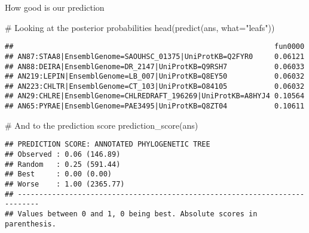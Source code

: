 \documentclass[9pt,ignorenonframetext,]{beamer}
\newenvironment{Shaded}{\begin{snugshade}}{\end{snugshade}}
\newcommand{\KeywordTok}[1]{\textcolor[rgb]{0.94,0.87,0.69}{#1}}
\newcommand{\DataTypeTok}[1]{\textcolor[rgb]{0.87,0.87,0.75}{#1}}
\newcommand{\StringTok}[1]{\textcolor[rgb]{0.80,0.58,0.58}{#1}}
\newcommand{\CommentTok}[1]{\textcolor[rgb]{0.50,0.62,0.50}{#1}}
\newcommand{\NormalTok}[1]{\textcolor[rgb]{0.80,0.80,0.80}{#1}}
\begin{document}
\begin{frame}[fragile,t]{How good is our prediction}

\footnotesize

\begin{Shaded}
\begin{Highlighting}[]
\CommentTok{# Looking at the posterior probabilities}
\KeywordTok{head}\NormalTok{(}\KeywordTok{predict}\NormalTok{(ans, }\DataTypeTok{what=}\StringTok{"leafs"}\NormalTok{))}
\end{Highlighting}
\end{Shaded}

\begin{verbatim}
##                                                             fun0000
## AN87:STAA8|EnsemblGenome=SAOUHSC_01375|UniProtKB=Q2FYR0     0.06121
## AN88:DEIRA|EnsemblGenome=DR_2147|UniProtKB=Q9RSH7           0.06033
## AN219:LEPIN|EnsemblGenome=LB_007|UniProtKB=Q8EY50           0.06032
## AN223:CHLTR|EnsemblGenome=CT_103|UniProtKB=O84105           0.06032
## AN29:CHLRE|EnsemblGenome=CHLREDRAFT_196269|UniProtKB=A8HYJ4 0.10564
## AN65:PYRAE|EnsemblGenome=PAE3495|UniProtKB=Q8ZT04           0.10611
\end{verbatim}

\begin{Shaded}
\begin{Highlighting}[]
\CommentTok{# And to the prediction score}
\KeywordTok{prediction_score}\NormalTok{(ans)}
\end{Highlighting}
\end{Shaded}

\begin{verbatim}
## PREDICTION SCORE: ANNOTATED PHYLOGENETIC TREE
## Observed : 0.06 (146.89)
## Random   : 0.25 (591.44)
## Best     : 0.00 (0.00)
## Worse    : 1.00 (2365.77)
## ---------------------------------------------------------------------------
## Values between 0 and 1, 0 being best. Absolute scores in parenthesis.
\end{verbatim}

\normalsize

\end{frame}
\end{document}
